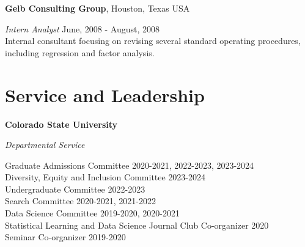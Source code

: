 \documentclass[margin,line]{res}
\begin{document}
\begin{resume}
{\bf Gelb Consulting Group}, Houston, Texas USA

\vspace{-.3cm}
{\em Intern Analyst} \hfill {June, 2008 - August, 2008}\\
Internal consultant focusing on revising several standard operating procedures, including regression and factor analysis. 

\section{\sc Service and Leadership}

{\bf Colorado State University}

\vspace{-.3cm}
{\em Departmental Service}

\vspace{-.3cm}
Graduate Admissions Committee \hfill {2020-2021, 2022-2023, 2023-2024} \\
Diversity, Equity and Inclusion Committee \hfill {2023-2024} \\
Undergraduate Committee \hfill {2022-2023} \\
Search Committee \hfill {2020-2021, 2021-2022} \\
Data Science Committee \hfill {2019-2020, 2020-2021} \\
Statistical Learning and Data Science Journal Club Co-organizer \hfill {2020} \\
Seminar Co-organizer \hfill {2019-2020} \\


\end{resume}
\end{document}

